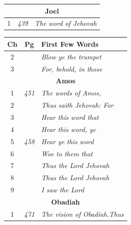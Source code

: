\documentclass{article}
\newlength{\minipageheight}
\newlength{\minipagewidth}
\begin{document}
\begin{flushright}
\begin{minipage}[r][\minipageheight][t]{\minipagewidth}
\begin{longtable}{ccl}
            \multicolumn{3}{c}{\textbf{Joel}}                                \\
            \hline
            1           & \textit{439} & \textit{The word of Jehovah}        \\
        \end{longtable}
    \end{minipage}%
    \begin{minipage}[r][\minipageheight][t]{3in}%
        \begin{longtable}{ccl}
            \textbf{Ch} & \textbf{Pg}  & \textbf{First Few Words}                  \\%
            \hline%
            \endfirsthead%
            2           &              & \textit{Blow ye the trumpet}              \\
            3           &              & \textit{For, behold, in those}            \\

            \multicolumn{3}{c}{\textbf{Amos}}                                      \\
            \hline
            1           & \textit{451} & \textit{The words of Amos,}               \\
            2           &              & \textit{Thus saith Jehovah: For}          \\
            3           &              & \textit{Hear this word that}              \\
            4           &              & \textit{Hear this word, ye}               \\
            5           & \textit{458} & \textit{Hear ye this word}                \\
            6           &              & \textit{Woe to them that}                 \\
            7           &              & \textit{Thus the Lord Jehovah}            \\
            8           &              & \textit{Thus the Lord Jehovah}            \\
            9           &              & \textit{I saw the Lord}                   \\

            \multicolumn{3}{c}{\textbf{Obadiah}}                                   \\
            \hline
            1           & \textit{471} & \textit{The vision of Obadiah.Thus}       \\


\end{longtable}
\end{minipage}
\end{flushright}
\end{document}
